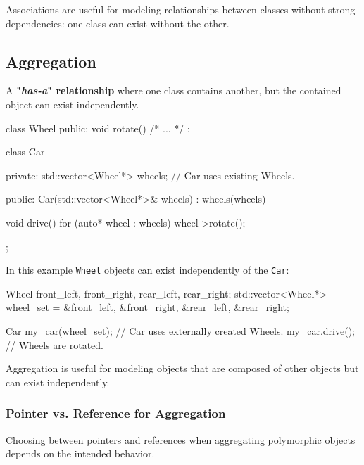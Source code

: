 \vspace{-0.5em}

Associations are useful for modeling relationships between classes without strong dependencies: one class can exist without the other.

\vspace{-0.5em}

\subsection{Aggregation}

A \textbf{"\textit{has-a}" relationship} where one class contains another, but the contained object can exist independently.

\begin{codeblock}[language=C++, numbers=none]
class Wheel {
public:
    void rotate() { /* ... */ }
};

class Car {
private:
    std::vector<Wheel*> wheels; // Car uses existing Wheels.

public:
    Car(std::vector<Wheel*>& wheels) : wheels(wheels) {}

    void drive() {
        for (auto* wheel : wheels) {
            wheel->rotate();
        }
    }
};
\end{codeblock}

In this example \texttt{Wheel} objects can exist independently of the \texttt{Car}:

\begin{codeblock}[language=C++]
    Wheel front_left, front_right, rear_left, rear_right;
    std::vector<Wheel*> wheel_set = {&front_left, &front_right, &rear_left, &rear_right};
    
    Car my_car(wheel_set); // Car uses externally created Wheels.
    my_car.drive(); // Wheels are rotated.
\end{codeblock}

Aggregation is useful for modeling objects that are composed of other objects but can exist independently.

\subsubsection{Pointer vs. Reference for Aggregation}

Choosing between pointers and references when aggregating polymorphic objects depends on the intended behavior.

\vspace{0.75em}

